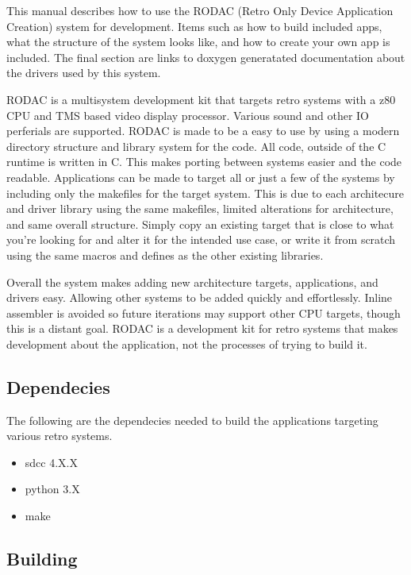 \documentclass{article}
\begin{document}
  \par
  This manual describes how to use the RODAC (Retro Only Device Application Creation) system for development.
  Items such as how to build included apps, what the structure of the system looks like, and how to create your
  own app is included. The final section are links to doxygen generatated documentation about the drivers used
  by this system.
  \par
  RODAC is a multisystem development kit that targets retro systems with a z80 CPU and TMS based video display
  processor. Various sound and other IO perferials are supported. RODAC is made to be a easy to use by using
  a modern directory structure and library system for the code. All code, outside of the C runtime is written
  in C. This makes porting between systems easier and the code readable. Applications can be made to target
  all or just a few of the systems by including only the makefiles for the target system. This is due to each
  architecure and driver library using the same makefiles, limited alterations for architecture, and same overall
  structure. Simply copy an existing target that is close to what you're looking for and alter it for the intended
  use case, or write it from scratch using the same macros and defines as the other existing libraries.
  \par
  Overall the system makes adding new architecture targets, applications, and drivers easy. Allowing other systems
  to be added quickly and effortlessly. Inline assembler is avoided so future iterations may support other CPU targets,
  though this is a distant goal. RODAC is a development kit for retro systems that makes development about the
  application, not the processes of trying to build it.

  \subsection{Dependecies}

  \par
  The following are the dependecies needed to build the applications targeting various retro systems.

  \begin{itemize}
    \item sdcc 4.X.X
    \item python 3.X
    \item make
  \end{itemize}

  \subsection{Building}
\end{document}

